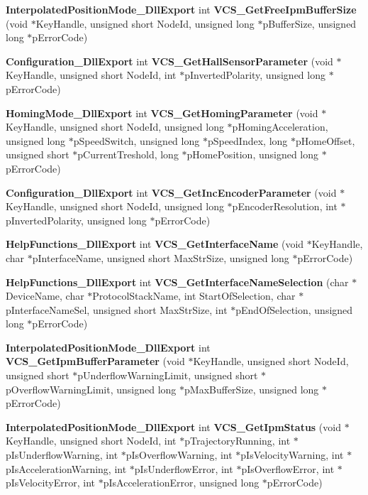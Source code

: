 \begin{DoxyCompactItemize}
\item 
{\bf \-Interpolated\-Position\-Mode\-\_\-\-Dll\-Export} \*
int {\bf \-V\-C\-S\-\_\-\-Get\-Free\-Ipm\-Buffer\-Size} (void $\ast$\-Key\-Handle, unsigned short \-Node\-Id, unsigned long $\ast$p\-Buffer\-Size, unsigned long $\ast$p\-Error\-Code)
\item 
{\bf \-Configuration\-\_\-\-Dll\-Export} int {\bf \-V\-C\-S\-\_\-\-Get\-Hall\-Sensor\-Parameter} (void $\ast$\-Key\-Handle, unsigned short \-Node\-Id, int $\ast$p\-Inverted\-Polarity, unsigned long $\ast$p\-Error\-Code)
\item 
{\bf \-Homing\-Mode\-\_\-\-Dll\-Export} int {\bf \-V\-C\-S\-\_\-\-Get\-Homing\-Parameter} (void $\ast$\-Key\-Handle, unsigned short \-Node\-Id, unsigned long $\ast$p\-Homing\-Acceleration, unsigned long $\ast$p\-Speed\-Switch, unsigned long $\ast$p\-Speed\-Index, long $\ast$p\-Home\-Offset, unsigned short $\ast$p\-Current\-Treshold, long $\ast$p\-Home\-Position, unsigned long $\ast$p\-Error\-Code)
\item 
{\bf \-Configuration\-\_\-\-Dll\-Export} int {\bf \-V\-C\-S\-\_\-\-Get\-Inc\-Encoder\-Parameter} (void $\ast$\-Key\-Handle, unsigned short \-Node\-Id, unsigned long $\ast$p\-Encoder\-Resolution, int $\ast$p\-Inverted\-Polarity, unsigned long $\ast$p\-Error\-Code)
\item 
{\bf \-Help\-Functions\-\_\-\-Dll\-Export} int {\bf \-V\-C\-S\-\_\-\-Get\-Interface\-Name} (void $\ast$\-Key\-Handle, char $\ast$p\-Interface\-Name, unsigned short \-Max\-Str\-Size, unsigned long $\ast$p\-Error\-Code)
\item 
{\bf \-Help\-Functions\-\_\-\-Dll\-Export} int {\bf \-V\-C\-S\-\_\-\-Get\-Interface\-Name\-Selection} (char $\ast$\-Device\-Name, char $\ast$\-Protocol\-Stack\-Name, int \-Start\-Of\-Selection, char $\ast$p\-Interface\-Name\-Sel, unsigned short \-Max\-Str\-Size, int $\ast$p\-End\-Of\-Selection, unsigned long $\ast$p\-Error\-Code)
\item 
{\bf \-Interpolated\-Position\-Mode\-\_\-\-Dll\-Export} \*
int {\bf \-V\-C\-S\-\_\-\-Get\-Ipm\-Buffer\-Parameter} (void $\ast$\-Key\-Handle, unsigned short \-Node\-Id, unsigned short $\ast$p\-Underflow\-Warning\-Limit, unsigned short $\ast$p\-Overflow\-Warning\-Limit, unsigned long $\ast$p\-Max\-Buffer\-Size, unsigned long $\ast$p\-Error\-Code)
\item 
{\bf \-Interpolated\-Position\-Mode\-\_\-\-Dll\-Export} \*
int {\bf \-V\-C\-S\-\_\-\-Get\-Ipm\-Status} (void $\ast$\-Key\-Handle, unsigned short \-Node\-Id, int $\ast$p\-Trajectory\-Running, int $\ast$p\-Is\-Underflow\-Warning, int $\ast$p\-Is\-Overflow\-Warning, int $\ast$p\-Is\-Velocity\-Warning, int $\ast$p\-Is\-Acceleration\-Warning, int $\ast$p\-Is\-Underflow\-Error, int $\ast$p\-Is\-Overflow\-Error, int $\ast$p\-Is\-Velocity\-Error, int $\ast$p\-Is\-Acceleration\-Error, unsigned long $\ast$p\-Error\-Code)

\end{DoxyCompactItemize}
